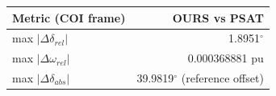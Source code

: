 \begin{tabular}{l r}\toprule
Metric (COI frame) & OURS vs PSAT\\\midrule
max $|\Delta\delta_{rel}|$ & 1.8951$^\circ$\\
max $|\Delta\omega_{rel}|$ & 0.000368881 pu\\
max $|\Delta\delta_{abs}|$ & 39.9819$^\circ$ (reference offset)\\
\bottomrule\end{tabular}
